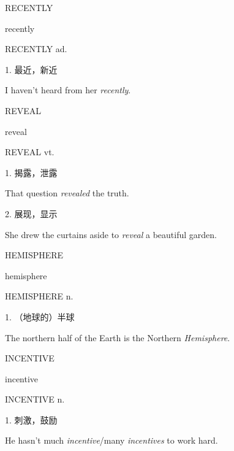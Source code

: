 \begin{flashcard}{
RECENTLY

recently
}
\begin{center}
RECENTLY ad. 
\end{center}
1. 最近，新近

I haven't heard from her \textit{recently}.

\end{flashcard}
\begin{flashcard}{
REVEAL

reveal
}
\begin{center}
REVEAL vt. 
\end{center}
1. 揭露，泄露

That question \textit{revealed} the truth.

2. 展现，显示

She drew the curtains aside to \textit{reveal} a beautiful garden.

\end{flashcard}
\begin{flashcard}{
HEMISPHERE

hemisphere
}
\begin{center}
HEMISPHERE n. 
\end{center}
1. （地球的）半球

The northern half of the Earth is the Northern \textit{Hemisphere}.

\end{flashcard}
\begin{flashcard}{
INCENTIVE

incentive
}
\begin{center}
INCENTIVE n. 
\end{center}
1. 刺激，鼓励

He hasn't much \textit{incentive}/many \textit{incentives} to work hard.

\end{flashcard}

